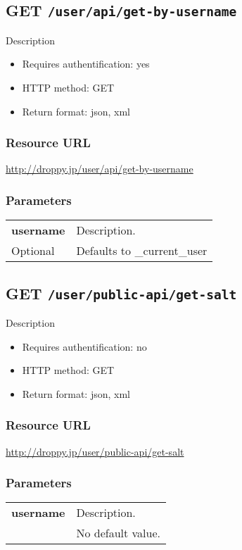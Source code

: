 \documentclass[11pt,a4paper]{article}
\newcommand{\content}[1]{\begin{minipage}{10cm}\vspace{2mm}#1\vspace{2mm}\end{minipage}}
\begin{document}
      \newpage
      
      
  \subsection*{GET {\tt /user/api/get-by-username}}
  Description
  \begin{itemize}
  \item Requires authentification: yes
  \item HTTP method: GET
  \item Return format: json, xml
  \end{itemize}
  \subsubsection*{Resource URL}
  \url{http://droppy.jp/user/api/get-by-username}
  \subsubsection*{Parameters}
  \begin{table}[h]
    \begin{center}
      \begin{tabular}{l l}
        \hline 
      \textbf{username} & \content{Description. }
      \\
      Optional & Defaults to \_current\_user\\
      \hline
      \end{tabular}
    \end{center}
  \end{table}
  
      \newpage
      
      
  \subsection*{GET {\tt /user/public-api/get-salt}}
  Description
  \begin{itemize}
  \item Requires authentification: no
  \item HTTP method: GET
  \item Return format: json, xml
  \end{itemize}
  \subsubsection*{Resource URL}
  \url{http://droppy.jp/user/public-api/get-salt}
  \subsubsection*{Parameters}
  \begin{table}[h]
    \begin{center}
      \begin{tabular}{l l}
        \hline 
      \textbf{username} & \content{Description. }
      \\
       & No default value.\\
      \hline
      \end{tabular}
    \end{center}
  \end{table}
  
\end{document}
